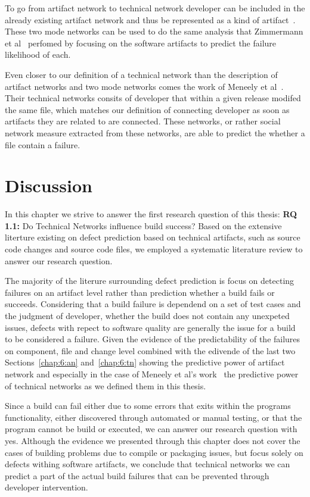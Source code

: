 To go from artifact network to technical network developer can be included in the already existing artifact network and thus be represented as a kind of artifact~\cite{pinzger:fse:2008}.
These two mode networks can be used to do the same analysis that Zimmermann et al~\cite{zimmermann:esem:2009,zimmermann:icse:2008} perfomed by focusing on the software artifacts to predict the failure likelihood of each.

Even closer to our definition of a technical network than the description of artifact networks and two mode networks comes the work of Meneely et al~\cite{meneely:fse:2008}.
Their technical networks consits of developer that within a given release modifed the same file, which matches our definition of connecting developer as soon as artifacts they are related to are connected.
These networks, or rather social network measure extracted from these networks, are able to predict the whether a file contain a failure.

\section{Discussion}
\label{chap:6:dis}
In this chapter we strive to answer the first research question of this thesis:
\textbf{RQ 1.1:} Do Technical Networks influence build success?
Based on the extensive literture existing on defect prediction based on technical artifacts, such as source code changes and source code files, we employed a systematic literature review to answer our research question.

The majority of the literure surrounding defect prediction is focus on detecting failures on an artifact level rather than prediction whether a build fails or succeeds.
Considering that a build failure is dependend on a set of test cases and the judgment of developer, whether the build does not contain any unexpeted issues, defects with repect to software quality are generally the issue for a build to be considered a failure.
Given the evidence of the predictability of the failures on component, file and change level combined with the edivende of the last two Sections~\ref{chap:6:an} and~\ref{chap:6:tn} showing the predictive power of artifact network and especially in the case of Meneely et al's work~\cite{meneely:fse:2008} the predictive power of technical networks as we defined them in this thesis.

Since a build can fail either due to some errors that exits within the programs functionality, either discovered through automated or manual testing, or that the program cannot be build or executed, we can answer our research question with yes.
Although the evidence we presented through this chapter does not cover the cases of building problems due to compile or packaging issues, but focus solely on defects withing software artifacts, we conclude that technical networks we can predict a part of the actual build failures that can be prevented through developer intervention.







